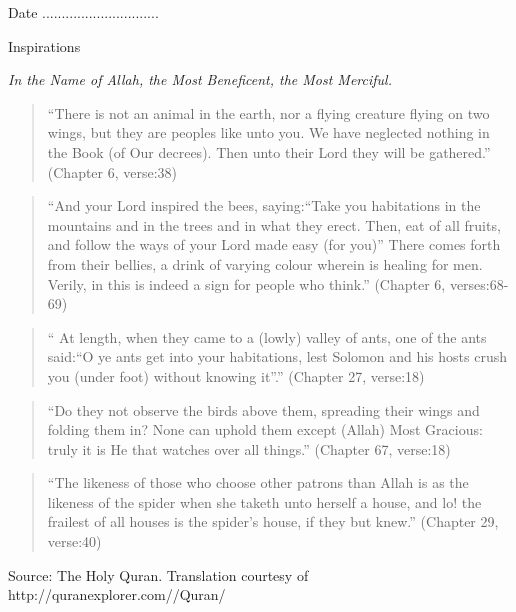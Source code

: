 \begin{titlepage}
\newline
Date ..............................\\
\newpage
\begin{center}
\noindent
\begin{Large}
\noindent
Inspirations\\
\end{Large}
\large
\textit{In the Name of Allah, the Most Beneficent, the Most Merciful.}
\HRule
\end{center}
\begin{verse}
``There is not an animal in the earth, nor a flying creature flying on two wings, but they are peoples like unto you. We have neglected nothing in the Book (of Our decrees). Then unto their Lord they will be gathered.'' (Chapter 6, verse:38)
\end{verse}

\begin{verse}
``And your Lord inspired the bees, saying:``Take you habitations in the mountains and in the trees and in what they erect. Then, eat of all fruits, and follow the ways of your Lord made easy (for you)'' There comes forth from their bellies, a drink of varying colour wherein is healing for men. Verily, in this is indeed a sign for people who think.''
(Chapter 6, verses:68-69)
\end{verse}

\begin{verse}
`` At length, when they came to a (lowly) valley of ants, one of the ants said:``O ye ants get into your habitations, lest Solomon and his hosts crush you (under foot) without knowing it''.''
(Chapter 27, verse:18) 
\end{verse}

\begin{verse}
``Do they not observe the birds above them, spreading their wings and folding them in? None can uphold them except (Allah) Most Gracious: truly it is He that watches over all things.'' 
(Chapter 67, verse:18)
\end{verse}

\begin{verse}
``The likeness of those who choose other patrons than Allah is as the likeness of the spider when she taketh unto herself a house, and lo! the frailest of all houses is the spider's house, if they but knew.''
(Chapter 29, verse:40) 
\end{verse}
\HRule
\newline
Source: The Holy Quran. Translation courtesy of http://quranexplorer.com//Quran/
\end{titlepage}
